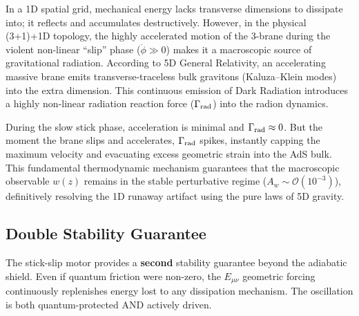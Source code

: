 In a 1D spatial grid, mechanical energy lacks transverse dimensions to dissipate into; it reflects and accumulates destructively. However, in the physical (3+1)+1D topology, the highly accelerated motion of the 3-brane during the violent non-linear ``slip'' phase ($\ddot{\phi} \gg 0$) makes it a macroscopic source of gravitational radiation. According to 5D General Relativity, an accelerating massive brane emits transverse-traceless bulk gravitons (Kaluza--Klein modes) into the extra dimension. This continuous emission of Dark Radiation introduces a highly non-linear radiation reaction force ($\Gamma_\text{rad}$) into the radion dynamics.

During the slow stick phase, acceleration is minimal and $\Gamma_\text{rad} \approx 0$. But the moment the brane slips and accelerates, $\Gamma_\text{rad}$ spikes, instantly capping the maximum velocity and evacuating excess geometric strain into the AdS bulk. This fundamental thermodynamic mechanism guarantees that the macroscopic observable $w(z)$ remains in the stable perturbative regime ($A_w \sim \mathcal{O}(10^{-3})$), definitively resolving the 1D runaway artifact using the pure laws of 5D gravity.

\subsection{Double Stability Guarantee}

The stick-slip motor provides a \textbf{second} stability guarantee beyond the adiabatic shield. Even if quantum friction were non-zero, the $E_{\mu\nu}$ geometric forcing continuously replenishes energy lost to any dissipation mechanism. The oscillation is both quantum-protected AND actively driven.
